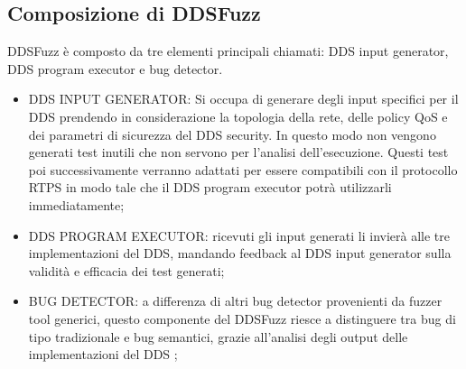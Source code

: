 \subsection{Composizione di DDSFuzz}
DDSFuzz è composto da tre elementi principali chiamati: 
DDS input generator, DDS program executor e bug detector.
\begin{itemize}
    \item DDS INPUT GENERATOR: Si occupa di generare degli input 
    specifici per il DDS prendendo in considerazione la topologia
    della rete, delle policy QoS e dei parametri di sicurezza del 
    DDS security. In questo modo non vengono generati test inutili 
    che non servono per l'analisi dell'esecuzione. 
    Questi test poi successivamente verranno adattati per essere 
    compatibili con il 
    protocollo RTPS in modo tale che il DDS program executor
    potrà utilizzarli
    immediatamente;
    \item DDS PROGRAM EXECUTOR: ricevuti gli input generati 
    li invierà alle
    tre implementazioni del DDS, mandando feedback  al DDS input generator
    sulla validità e efficacia dei test generati;
    \item BUG DETECTOR: a differenza di altri bug detector provenienti da 
    fuzzer tool generici, questo componente del DDSFuzz riesce
    a distinguere tra bug 
    di tipo tradizionale e bug semantici, grazie all'analisi
    degli output delle implementazioni del DDS
    \cite{10.1145/3691620.3695073};
\end{itemize}